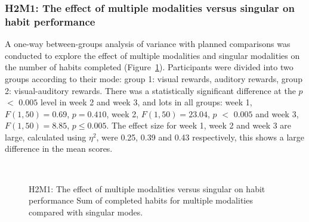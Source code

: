 \subsubsection*{H2M1: The effect of multiple modalities versus singular on habit performance}
A one-way between-groups analysis of variance with planned comparisons was conducted to explore the effect of multiple modalities and singular modalities on the number of habits completed (Figure~\ref{fig:m1_h2}). Participants were divided into two groups according to their mode: group 1: visual rewards, auditory rewards, group 2: visual-auditory rewards. There was a statistically significant difference at the $p$ $<$ $0.005$ level in week 2 and week 3, and lots in all groups: week 1, $F(1,50) = 0.69$, $p = 0.410$, week 2, $F(1,50) = 23.04$, $p$ $<$ $0.005$ and week 3, $F(1,50) = 8.85$, $p\leq 0.005$. The effect size for week 1, week 2 and week 3 are large, calculated using $\eta^{2}$, were 0.25, 0.39 and 0.43 respectively, this shows a large difference in the mean scores.

\begin{figure}[H]
\centering

  \caption{H2M1: The effect of multiple modalities versus singular on habit performance Sum of completed habits for multiple modalities compared with singular modes.}~\label{fig:m1_h2}
\end{figure}


